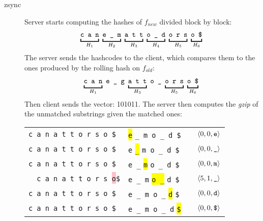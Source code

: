 \begin{description}
  \item[zsync] Server starts computing the hashes of $f_{new}$ divided block by
  block:
  \begin{align*}
    \underbracket{\vphantom{\tt g}\texttt{c a n}}_{H_1}\
    \underbracket{\vphantom{\tt g}\texttt{e \_ m}}_{H_2}\
    \underbracket{\vphantom{\tt g}\texttt{a t t}}_{H_3}\
    \underbracket{\vphantom{\tt g}\texttt{o \_ d}}_{H_4}\
    \underbracket{\vphantom{\tt g}\texttt{o r s}}_{H_5}\
    \underbracket{\vphantom{\tt g}\texttt{o \$}}_{H_6}\
  \end{align*}
  The server sends the hashcodes to the client, which compares them to the ones
  produced by the rolling hash on $f_{old}$:
  \begin{align*}
    \underbracket{\vphantom{\tt g}\texttt{c a n}}_{H_1}\
    \texttt{e \_ g}\
    \underbracket{\vphantom{\tt g}\texttt{a t t}}_{H_3}\
    \texttt{o \_}\
    \underbracket{\vphantom{\tt g}\texttt{o r s}}_{H_5}\
    \underbracket{\vphantom{\tt g}\texttt{o \$}}_{H_6}\
  \end{align*}
  Then client sends the vector: 101011. The server then computes the \emph{gzip}
  of the unmatched substrings given the matched ones:
  \begin{table}[H]
    \centering
    \begin{tabular}{r|lcl}
    \tt{c a n a t t o r s o \$} & \colorbox{yellow}{\tt e}
    {\tt \_ m o \_ d \$} & &
    $\langle 0, 0, \text{\tt e} \rangle$ \\
    \tt{c a n a t t o r s o \$} & {\tt e} \colorbox{yellow}{\tt \_}
    {\tt m o \_ d \$} & & $\langle 0, 0, \text{\tt \_} \rangle$ \\
    \tt{c a n a t t o r s o \$} & {\tt e \_} \colorbox{yellow}{\tt m}
    {\tt o \_ d \$} & & $\langle 0, 0, \text{\tt m} \rangle$ \\
    \tt{c a n a t t o r s} \colorbox{pink}{o}{\tt \$}& {\tt e \_ m}
    \colorbox{yellow}{\tt o \_} {\tt d \$} & &
    $\langle 5, 1, \text{\tt \_} \rangle$ \\
    \tt{c a n a t t o r s o \$} & {\tt e \_ m o \_} \colorbox{yellow}{\tt d}
    {\tt \$} & & $\langle 0, 0, \text{\tt d} \rangle$ \\
    \tt{c a n a t t o r s o \$} & {\tt e \_ m o \_ d} \colorbox{yellow}{\tt \$}
    & & $\langle 0, 0, \text{\tt \$} \rangle$ \\
    \end{tabular}
  \end{table}

\end{description}

